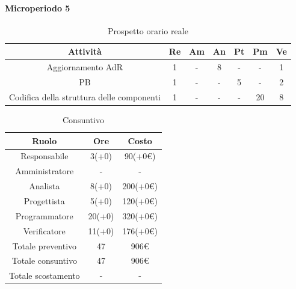 \paragraph{Microperiodo 5}
\begin{table}[H]
	\centering
	\begin{tabular}{|c|c|c|c|c|c|c|}
		\hline
		\rowcolor{lighter-grayer}
		\textbf{Attività} & \textbf{Re}        & \textbf{Am}        & \textbf{An}        & \textbf{Pt}        & \textbf{Pm}        & \textbf{Ve}        \\ \hline
		
		Aggiornamento AdR                         & 1 & - & 8 & - & -  & 1 \\ \hline
		PB                                        & 1 & - & - & 5 & -  & 2 \\ \hline
		Codifica della struttura delle componenti & 1 & - & - & - & 20 & 8 \\ \hline		
		
	\end{tabular}
	\caption{ Prospetto orario reale\\}
\end{table}

\begin{table}[H]
	\centering
	\renewcommand{\arraystretch}{1.5}
	\begin{tabular}{|c|c|c|}
		\hline
		\rowcolor{lighter-grayer}
		Ruolo & Ore & Costo \\ \hline
		Responsabile & 3(+0) & 90(+0\euro) \\ \hline
		Amministratore & - & - \\ \hline
		Analista & 8(+0) & 200(+0\euro) \\ \hline
		Progettista & 5(+0) & 120(+0\euro) \\ \hline
		Programmatore & 20(+0) & 320(+0\euro) \\ \hline
		Verificatore & 11(+0) & 176(+0\euro) \\ \hline
		Totale preventivo & 47 & 906\euro \\ \hline
		Totale consuntivo & 47 & 906\euro \\ \hline
		Totale scostamento & - & - \\ \hline
	\end{tabular}
	\caption{ Consuntivo\\}
\end{table}

